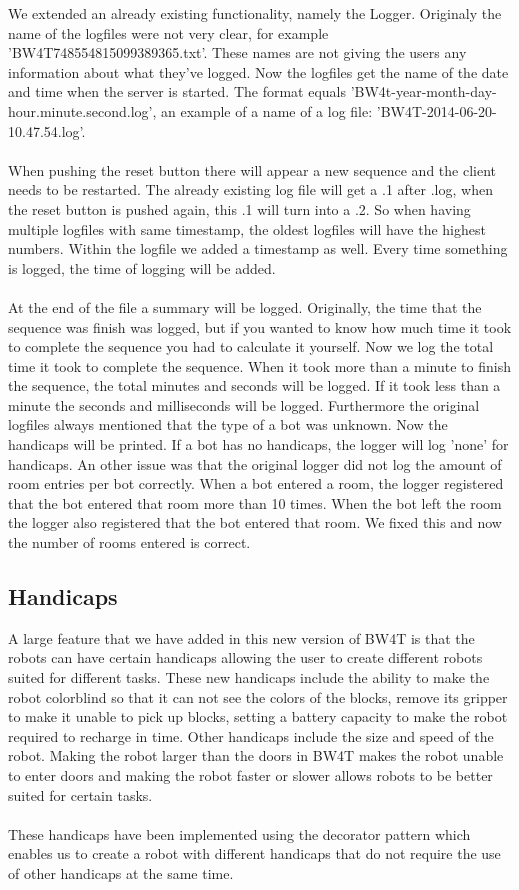 \documentclass[]{article}
\begin{document}
We extended an already existing functionality, namely the Logger. Originaly the name of the logfiles were not very clear, for example 'BW4T748554815099389365.txt’. These names are not giving the users any information about what they’ve logged. Now the logfiles get the name of the date and time when the server is started. The format equals 'BW4t-year-month-day-hour.minute.second.log’, an example of a name of a log file: 'BW4T-2014-06-20-10.47.54.log’. \\
\\
When pushing the reset button there will appear a new sequence and the client needs to be restarted. The already existing log file will get a .1 after .log, when the reset button is pushed again, this .1 will turn into a .2. So when having multiple logfiles with same timestamp, the oldest logfiles will have the highest numbers. Within the logfile we added a timestamp as well. Every time something is logged, the time of logging will be added.\\
\\
At the end of the file a summary will be logged. Originally, the time that the sequence was finish was logged, but if you wanted to know how much time it took to complete the sequence you had to calculate it yourself. Now we log the total time it took to complete the sequence. When it took more than a minute to finish the sequence, the total minutes and seconds will be logged. If it took less than a minute the seconds and milliseconds will be logged. Furthermore the original logfiles always mentioned that the type of a bot was unknown. Now the handicaps will be printed. If a bot has no handicaps, the logger will log 'none' for handicaps. An other issue was that the original logger did not log the amount of room entries per bot correctly. When a bot entered a room, the logger registered that the bot entered that room more than 10 times. When the bot left the room the logger also registered that the bot entered that room. We fixed this and now the number of rooms entered is correct.
\subsection{Handicaps}
A large feature that we have added in this new version of BW4T is that the robots can have certain handicaps allowing the user to create different robots suited for different tasks. These new handicaps include the ability to make the robot colorblind so that it can not see the colors of the blocks, remove its gripper to make it unable to pick up blocks, setting a battery capacity to make the robot required to recharge in time. Other handicaps include the size and speed of the robot. Making the robot larger than the doors in BW4T makes the robot unable to enter doors and making the robot faster or slower allows robots to be better suited for certain tasks.\\
\\
These handicaps have been implemented using the decorator pattern which enables us to create a robot with different handicaps that do not require the use of other handicaps at the same time.
\end{document}
